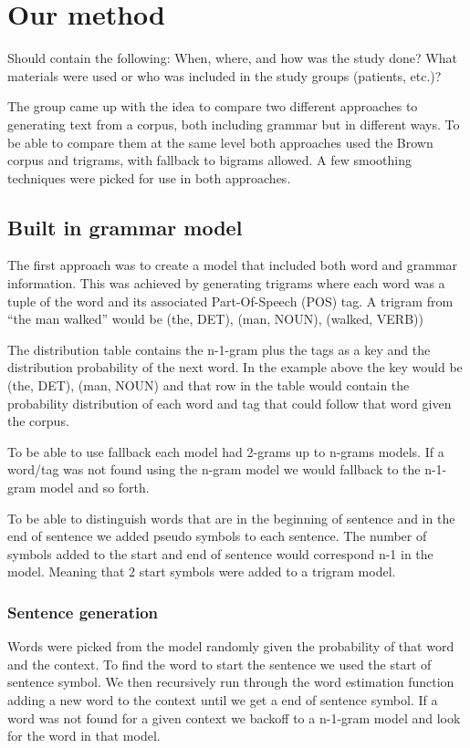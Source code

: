 \documentclass[a4paper,12pt]{article}
\begin{document}
\section{Our method}
\label{sec:method}

Should contain the following: When, where, and how was the study done? What materials were used or who was included in the study groups (patients, etc.)?

The group came up with the idea to compare two different approaches to generating text from a corpus, both including grammar but in different ways. To be able to compare them at the same level both approaches used the Brown corpus and trigrams, with fallback to bigrams allowed. A few smoothing techniques were picked for use in both approaches.
\subsection{Built in grammar model}
The first approach was to create a model that included both word and grammar information. This was achieved by generating trigrams where each word was a tuple of the word and its associated Part-Of-Speech (POS) tag. A trigram from ``the man walked'' would be (the, DET), (man, NOUN), (walked, VERB))

The distribution table contains the n-1-gram plus the tags as a key and the distribution probability of the next word. In the example above the key would be (the, DET), (man, NOUN) and that row in the table would contain the probability distribution of each word and tag that could follow that word given the corpus.

To be able to use fallback each model had 2-grams up to n-grams models. If a word/tag was not found using the n-gram model we would fallback to the n-1-gram model and so forth.

To be able to distinguish words that are in the beginning of sentence and in the end of sentence we added pseudo symbols to each sentence. The number of symbols added to the start and end of sentence would correspond n-1 in the model. Meaning that 2 start symbols were added to a trigram model.

\subsubsection{Sentence generation}
Words were picked from the model randomly given the probability of that word and the context. To find the word to start the sentence we used the start of sentence symbol. We then recursively run through the word estimation function adding a new word to the context until we get a end of sentence symbol. If a word was not found for a given context we backoff to a n-1-gram model and look for the word in that model.
\end{document}
